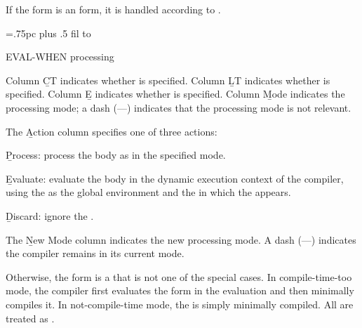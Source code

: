   If the form is an  form, it is
handled according to \thenextfigure.

\boxfig
{=.75pc
\tabskip {} plus .5 fil
\offinterlineskip
\halign to }
\caption{EVAL-WHEN processing}
\endfig

Column \b{CT}   indicates whether  is specified.
Column \b{LT}   indicates whether  is specified.
Column \b{E}    indicates whether  is specified.  
Column \b{Mode} indicates the processing mode; 
		a dash (---) indicates that the processing mode is not relevant.
   
The \b{Action} column specifies one of three actions:

\beginlist

 \item{}\b{Process:} process the body as  in the
specified mode.
 
 \item{}\b{Evaluate:} evaluate the body in the dynamic execution
context of the compiler, using the  as
the global environment and the  in which
the  appears.
 
\item{}\b{Discard:} ignore the .
\endlist

The \b{New Mode} column indicates the new processing mode. 
A dash (---) indicates the compiler remains in its current mode.

  Otherwise, the form is a  that
is not one of the special cases.  In compile-time-too mode, the
compiler first evaluates the form in the evaluation 
 and then minimally compiles it.  In not-compile-time
mode, the  is simply minimally compiled.  All 
are treated as .

